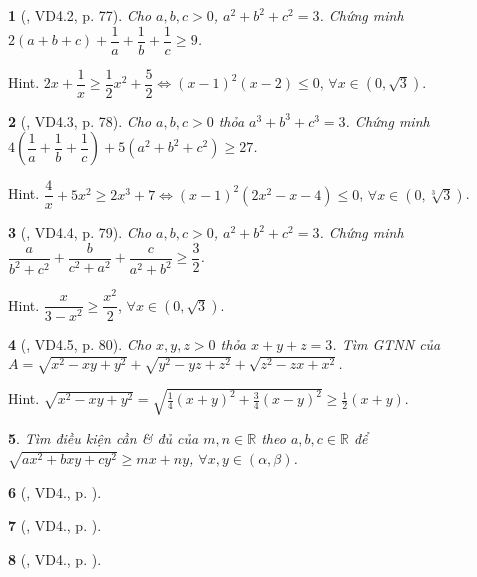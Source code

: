 \documentclass{article}
\newtheorem{baitoan}{}
\begin{document}
\begin{baitoan}[\cite{Son_Nghiep_Trung_Can_bdt}, VD4.2, p. 77]
	Cho $a,b,c > 0$, $a^2 + b^2 + c^2 = 3$. Chứng minh $2(a + b + c) + \dfrac{1}{a} + \dfrac{1}{b} + \dfrac{1}{c}\ge9$.
\end{baitoan}
{\sf Hint.} $2x + \dfrac{1}{x}\ge\dfrac{1}{2}x^2 + \dfrac{5}{2}\Leftrightarrow(x - 1)^2(x - 2)\le0$, $\forall x\in(0,\sqrt{3})$.

\begin{baitoan}[\cite{Son_Nghiep_Trung_Can_bdt}, VD4.3, p. 78]
	Cho $a,b,c > 0$ thỏa $a^3 + b^3 + c^3 = 3$. Chứng minh $4\left(\dfrac{1}{a} + \dfrac{1}{b} + \dfrac{1}{c}\right) + 5(a^2 + b^2 + c^2)\ge27$.
\end{baitoan}
{\sf Hint.} $\dfrac{4}{x} + 5x^2\ge2x^3 + 7\Leftrightarrow(x - 1)^2(2x^2 - x - 4)\le0$, $\forall x\in(0,\sqrt[3]{3})$.

\begin{baitoan}[\cite{Son_Nghiep_Trung_Can_bdt}, VD4.4, p. 79]
	Cho $a,b,c > 0$, $a^2 + b^2 + c^2 = 3$. Chứng minh $\dfrac{a}{b^2 + c^2} + \dfrac{b}{c^2 + a^2} + \dfrac{c}{a^2 + b^2}\ge\dfrac{3}{2}$.
\end{baitoan}
{\sf Hint.} $\dfrac{x}{3 - x^2}\ge\dfrac{x^2}{2}$, $\forall x\in(0,\sqrt{3})$.

\begin{baitoan}[\cite{Son_Nghiep_Trung_Can_bdt}, VD4.5, p. 80]
	Cho $x,y,z > 0$ thỏa $x + y + z = 3$. Tìm {\rm GTNN} của $A = \sqrt{x^2- xy + y^2} + \sqrt{y^2 - yz + z^2} + \sqrt{z^2 - zx + x^2}$.
\end{baitoan}
{\sf Hint.} $\sqrt{x^2- xy + y^2} = \sqrt{\frac{1}{4}(x + y)^2 + \frac{3}{4}(x - y)^2}\ge\frac{1}{2}(x + y)$.

\begin{baitoan}
	Tìm điều kiện cần \& đủ của $m,n\in\mathbb{R}$ theo $a,b,c\in\mathbb{R}$ để $\sqrt{ax^2 + bxy + cy^2}\ge mx + ny$, $\forall x,y\in(\alpha,\beta)$.
\end{baitoan}

\begin{baitoan}[\cite{Son_Nghiep_Trung_Can_bdt}, VD4., p. ]
	
\end{baitoan}

\begin{baitoan}[\cite{Son_Nghiep_Trung_Can_bdt}, VD4., p. ]
	
\end{baitoan}

\begin{baitoan}[\cite{Son_Nghiep_Trung_Can_bdt}, VD4., p. ]
	
\end{baitoan}
\end{document}
